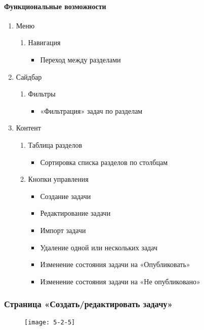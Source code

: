 \paragraph{Функциональные возможности}
\begin{enumerate}
	\item Меню
	\begin{enumerate}
		\item Навигация
		\begin{itemize}
			\item Переход между разделами
		\end{itemize}
	\end{enumerate}

	\item Сайдбар
	\begin{enumerate}
		\item Фильтры
		\begin{itemize}
			\item «Фильтрация» задач по разделам
		\end{itemize}
	\end{enumerate}

	\item Контент
	\begin{enumerate}
		\item Таблица разделов
		\begin{itemize}
			\item Сортировка списка разделов по столбцам
		\end{itemize}

		\item Кнопки управления
		\begin{itemize}
			\item Создание задачи
			\item Редактирование задачи
			\item Импорт задачи
			\item Удаление одной или нескольких задач
			\item Изменение состояния задачи на «Опубликовать»
			\item Изменение состояния задачи на «Не опубликовано»
		\end{itemize}
	\end{enumerate}
\end{enumerate}

\subsubsection{Страница «Создать/редактировать задачу»}
\begin{figure}[H]
	\texttt{[image: 5-2-5]}
\end{figure}
